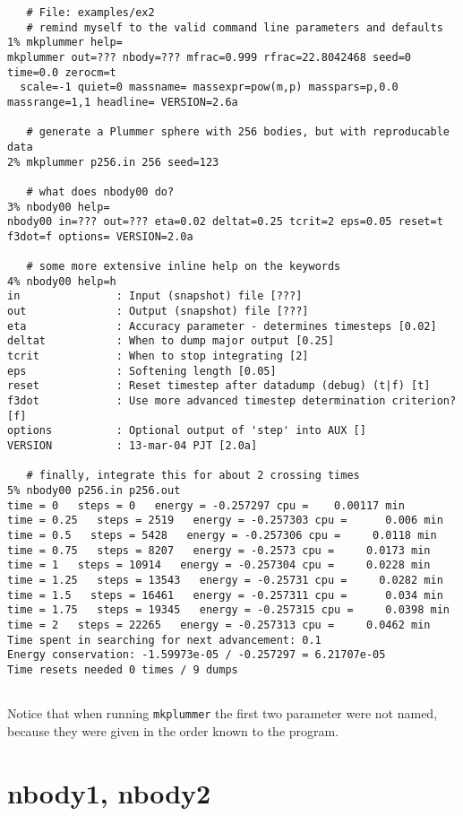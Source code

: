 \footnotesize\begin{verbatim}
   # File: examples/ex2
   # remind myself to the valid command line parameters and defaults
1% mkplummer help=
mkplummer out=??? nbody=??? mfrac=0.999 rfrac=22.8042468 seed=0 time=0.0 zerocm=t 
  scale=-1 quiet=0 massname= massexpr=pow(m,p) masspars=p,0.0 massrange=1,1 headline= VERSION=2.6a

   # generate a Plummer sphere with 256 bodies, but with reproducable data
2% mkplummer p256.in 256 seed=123

   # what does nbody00 do?
3% nbody00 help=
nbody00 in=??? out=??? eta=0.02 deltat=0.25 tcrit=2 eps=0.05 reset=t f3dot=f options= VERSION=2.0a

   # some more extensive inline help on the keywords
4% nbody00 help=h
in               : Input (snapshot) file [???]
out              : Output (snapshot) file [???]
eta              : Accuracy parameter - determines timesteps [0.02]
deltat           : When to dump major output [0.25]
tcrit            : When to stop integrating [2]
eps              : Softening length [0.05]
reset            : Reset timestep after datadump (debug) (t|f) [t]
f3dot            : Use more advanced timestep determination criterion? [f]
options          : Optional output of 'step' into AUX []
VERSION          : 13-mar-04 PJT [2.0a]

   # finally, integrate this for about 2 crossing times
5% nbody00 p256.in p256.out
time = 0   steps = 0   energy = -0.257297 cpu =    0.00117 min
time = 0.25   steps = 2519   energy = -0.257303 cpu =      0.006 min
time = 0.5   steps = 5428   energy = -0.257306 cpu =     0.0118 min
time = 0.75   steps = 8207   energy = -0.2573 cpu =     0.0173 min
time = 1   steps = 10914   energy = -0.257304 cpu =     0.0228 min
time = 1.25   steps = 13543   energy = -0.25731 cpu =     0.0282 min
time = 1.5   steps = 16461   energy = -0.257311 cpu =      0.034 min
time = 1.75   steps = 19345   energy = -0.257315 cpu =     0.0398 min
time = 2   steps = 22265   energy = -0.257313 cpu =     0.0462 min
Time spent in searching for next advancement: 0.1
Energy conservation: -1.59973e-05 / -0.257297 = 6.21707e-05
Time resets needed 0 times / 9 dumps


\end{verbatim}\normalsize

Notice that when running {\tt mkplummer} the first two parameter
were not named, because they were given in the order known to the program.


\section{nbody1, nbody2}

